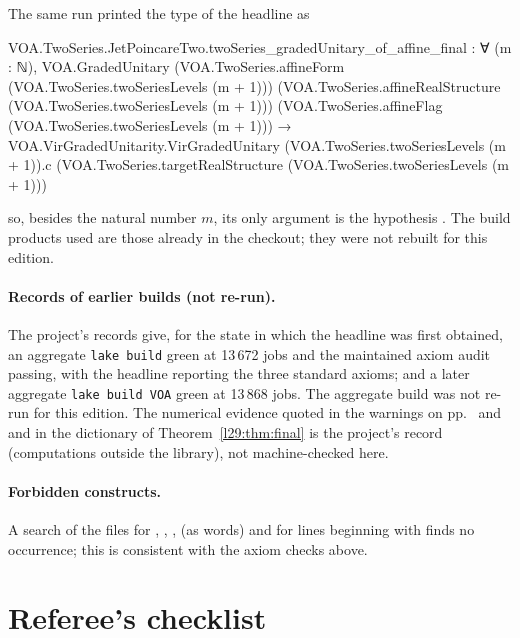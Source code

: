 The same run printed the type of the headline as
\begin{plaincode}
VOA.TwoSeries.JetPoincareTwo.twoSeries_gradedUnitary_of_affine_final : ∀ (m : ℕ),
  VOA.GradedUnitary (VOA.TwoSeries.affineForm (VOA.TwoSeries.twoSeriesLevels (m + 1)))
      (VOA.TwoSeries.affineRealStructure (VOA.TwoSeries.twoSeriesLevels (m + 1)))
      (VOA.TwoSeries.affineFlag (VOA.TwoSeries.twoSeriesLevels (m + 1))) →
    VOA.VirGradedUnitarity.VirGradedUnitary (VOA.TwoSeries.twoSeriesLevels (m + 1)).c
      (VOA.TwoSeries.targetRealStructure (VOA.TwoSeries.twoSeriesLevels (m + 1)))
\end{plaincode}
so, besides the natural number $m$, its only argument is the hypothesis . The build products used are those already in the
checkout; they were not rebuilt for this edition.

\paragraph{Records of earlier builds (not re-run).} The project's records give, for the state in which the headline was first
obtained, an aggregate \texttt{lake build} green at 13\,672 jobs and the maintained axiom audit passing, with the headline
reporting the three standard axioms; and a later aggregate \texttt{lake build VOA} green at 13\,868 jobs. The aggregate build was not
re-run for this edition. The numerical evidence quoted in the warnings on pp.~\pageref{l29:warn:cyclic} and \pageref{l29:warn:deadends}
and in the dictionary of Theorem~\ref{l29:thm:final} is the project's record (computations outside the library), not machine-checked here.

\paragraph{Forbidden constructs.} A search of the  files for , , ,
 (as words) and for lines beginning with  finds no occurrence; this is consistent with the axiom
checks above.

\section{Referee's checklist}\label{l29:sec:checklist}

